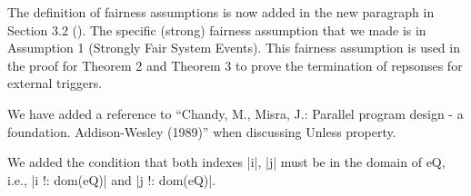 \documentclass{response}
\begin{document}
\begin{response}
  The definition of fairness assumptions is now added in the new
  paragraph in Section 3.2 (\EventB).  The specific (strong) fairness
  assumption that we made is in Assumption 1 (Strongly Fair System
  Events). This fairness assumption is used in the proof for Theorem 2
  and Theorem 3 to prove the termination of repsonses for external
  triggers.
\end{response}


\begin{comment}{Reviewer \#1}
• p.25 A reference to the seminal Unless of Unity could be in order.
\end{comment}

\begin{response}
  We have added a reference to ``Chandy, M., Misra, J.: Parallel
  program design - a foundation. Addison-Wesley (1989)'' when
  discussing Unless property.
\end{response}


\begin{comment}{Reviewer \#1}
• p. 26 (Theorem 5) I think that the indexes in eQ should be first stated
as legal in both quantifications.
\end{comment}

\begin{response}
  We added the condition that both indexes |i|, |j| must be in the
  domain of eQ, i.e., |i !: dom(eQ)| and |j !: dom(eQ)|.
\end{response}


\begin{comment}{Reviewer \#1}
• p. 27 All the temporal proofs have been done in an adhoc way without
any tool support. It would be interesting to have a feedback about
this? To be provocative, if you are interested in temporal proofs why
did you choose this tool? Have you considered TLA which does support
temporal proofs (as well as refinements in a certain way)?
\end{comment}
\end{document}
